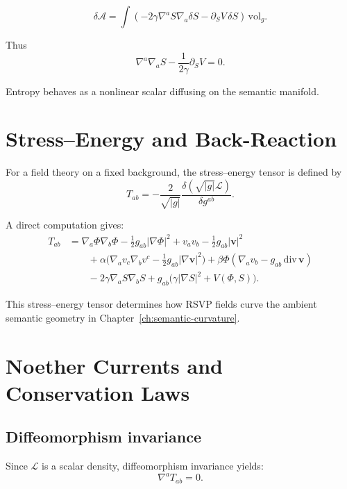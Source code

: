 \[
\delta\mathcal{A} = \int (-2\gamma \nabla^a S \nabla_a \delta S - \partial_S V \,\delta S)\,\mathrm{vol}_g.
\]

Thus
\begin{equation}
\label{eq:S-eom}
\nabla^a \nabla_a S - \frac{1}{2\gamma} \partial_S V = 0.
\end{equation}

Entropy behaves as a nonlinear scalar diffusing on the semantic manifold.

\section{Stress--Energy and Back-Reaction}

For a field theory on a fixed background, the stress--energy tensor is defined by
\[
T_{ab} = -\frac{2}{\sqrt{|g|}} \frac{\delta (\sqrt{|g|}\mathcal{L})}{\delta g^{ab}}.
\]

A direct computation gives:
\begin{align}
T_{ab} &=
  \nabla_a \Phi \nabla_b \Phi
 - \frac{1}{2} g_{ab} |\nabla \Phi|^2
 + v_a v_b - \frac{1}{2} g_{ab} |\mathbf{v}|^2 \\
&\qquad
 + \alpha\big(
    \nabla_a v_c \nabla_b v^c
    - \frac{1}{2} g_{ab} |\nabla \mathbf{v}|^2
   \big)
 + \beta \Phi (\nabla_a v_b - g_{ab}\,\mathrm{div}\,\mathbf{v}) \\
&\qquad
 - 2\gamma \nabla_a S \nabla_b S
 + g_{ab}\big( \gamma |\nabla S|^2 + V(\Phi, S) \big).
\end{align}

This stress--energy tensor determines how RSVP fields curve the ambient semantic geometry in Chapter~\ref{ch:semantic-curvature}.

\section{Noether Currents and Conservation Laws}

\subsection{Diffeomorphism invariance}

Since $\mathcal{L}$ is a scalar density, diffeomorphism invariance yields:
\[
\nabla^a T_{ab} = 0.
\]

